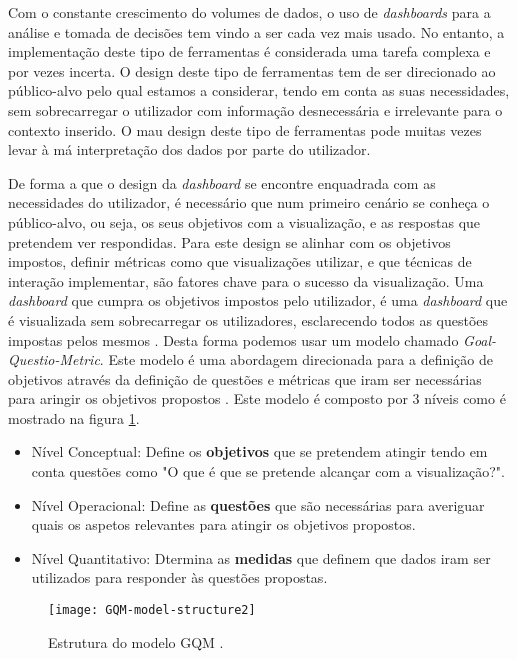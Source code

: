Com o constante crescimento do volumes de dados, o uso de \textit{dashboards} para a análise e tomada de decisões tem vindo a ser cada vez mais usado. No entanto, a implementação deste tipo de ferramentas é considerada uma tarefa complexa e por vezes incerta. O design deste tipo de ferramentas tem de ser direcionado ao público-alvo pelo qual estamos a considerar, tendo em conta as suas necessidades, sem sobrecarregar o utilizador com informação desnecessária e irrelevante para o contexto inserido. O mau design deste tipo de ferramentas pode muitas vezes levar à má interpretação dos dados por parte do utilizador.

De forma a que o design da \textit{dashboard} se encontre enquadrada com as necessidades do utilizador, é necessário que num primeiro cenário se conheça o público-alvo, ou seja, os seus objetivos com a visualização, e as respostas que pretendem ver respondidas. Para este design se alinhar com os objetivos impostos, definir métricas como que visualizações utilizar, e que técnicas de interação implementar, são fatores chave para o sucesso da visualização. Uma \textit{dashboard} que cumpra os objetivos impostos pelo utilizador, é uma \textit{dashboard} que é visualizada sem sobrecarregar os utilizadores, esclarecendo todos as questões impostas pelos mesmos \cite{pappas2011riding}. Desta forma podemos usar um modelo chamado \textit{Goal-Questio-Metric}. Este modelo é uma abordagem direcionada para a definição de objetivos através da definição de questões e métricas que iram ser necessárias para aringir os objetivos propostos \cite{janes2013effective}. Este modelo é composto por 3 níveis como é mostrado na figura \ref{fig:gqm-model}.

\begin{itemize}
  \item Nível Conceptual: Define os \textbf{objetivos} que se pretendem atingir tendo em conta questões como "O que é que se pretende alcançar com a visualização?".
  \item Nível Operacional: Define as \textbf{questões} que são necessárias para averiguar quais os aspetos relevantes para atingir os objetivos propostos. 
  \item Nível Quantitativo: Dtermina as \textbf{medidas} que definem que dados iram ser utilizados para responder às questões propostas.
\end{itemize}

\begin{figure}[htbp]
  \centering
  \texttt{[image: GQM-model-structure2]}
  \caption{Estrutura do modelo GQM \cite{article}.}
  \label{fig:gqm-model}
\end{figure}

